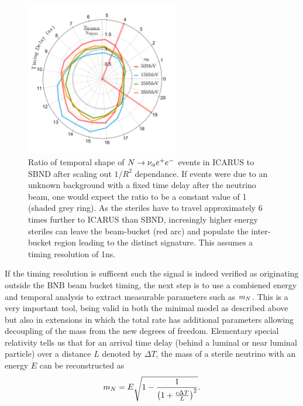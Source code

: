 \documentclass[11pt, a4paper]{article}
\def\ster{\ensuremath N}
\begin{document}
\begin{figure}[t]
\center
\includegraphics[width=0.6\textwidth]{figures/ICARUS_the_great.pdf}

\caption{\label{fig:icarus_the_great}
Ratio of temporal shape of $\ster \rightarrow \nu_\alpha e^+ e^-$ events in ICARUS to SBND after scaling out $1/R^2$ dependance. If events were due to an unknown background with a fixed time delay after the neutrino beam, one would expect the ratio to be a constant value of 1 (shaded grey ring). As the steriles have to travel approximately 6 times further to ICARUS than SBND, incresingly higher energy steriles can leave the beam-bucket (red arc) and populate the inter-bucket region leading to the distinct signature. This assumes a timing resolution of 1ns. }

\end{figure}


If the timing resolution is sufficent such the signal is indeed verified as
originating outside the BNB beam bucket timing, the next step is to use a
combiened energy and temporal analysis to extract measurable parameters such as
$m_\ster$. This is a very important tool, being valid in both the minimal model
as described above but also in extensions in which the total rate has
additional parameters allowing decoupling of the mass from the new degrees of
freedom.  Elementary special relativity tells us that for an arrival time delay
(behind a luminal or near luminal particle) over a distance $L$ denoted by
$\Delta T$, the mass of a sterile neutrino with an energy $E$ can be
reconstructed as 
%
\[ m_{\ster} = E\sqrt{1-\frac{1}{\left(1+\frac{c\Delta T}{L}\right)^2}}. \]
\end{document}
